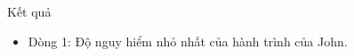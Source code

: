 Kết quả
\begin{itemize}
	\item     Dòng 1: Độ nguy hiểm nhỏ nhất của hành trình của John.   
\end{itemize}